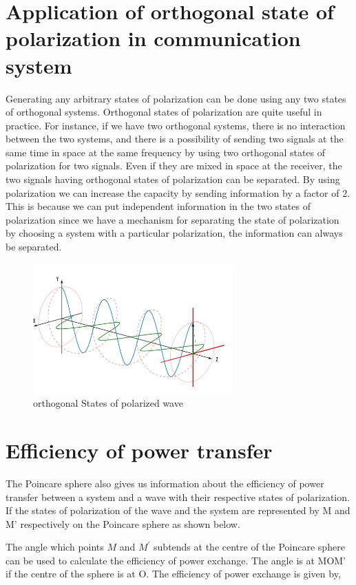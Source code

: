 \section{Application of orthogonal state of polarization in communication system}	
Generating any arbitrary states of polarization can be done using any two states of orthogonal systems. Orthogonal states of polarization are quite useful in practice. For instance, if we have two orthogonal systems, there is no interaction between the two systems, and there is a possibility of sending two signals at the same time in space at the same frequency by using two orthogonal states of polarization for two signals. Even if they are mixed in space at the receiver, the two signals having orthogonal states of polarization can be separated. By using polarization we can increase the capacity by sending information by a factor of 2. This is because we can put independent information in the two states of polarization since we have a mechanism for separating the state of polarization by choosing a system with a particular polarization, the information can always be separated.	
\begin{figure}[h]
\centering
\includegraphics[height=5cm]{"./graphics/orthogonal polarized wave"}
\caption{orthogonal States of polarized wave}
\label{fig:orthogonal-polarized-wave}
\end{figure}


\section{Efficiency of power transfer}
The Poincare sphere also gives us information about the efficiency of power transfer between a system and a wave with their respective states of polarization. If the states of polarization of the wave and the system are represented by M and M' respectively on the Poincare sphere as shown below.

The angle which points $M$ and $M^'$ subtends at the centre of the Poincare sphere can be used to calculate the efficiency of power exchange.
The angle is at MOM' if the centre of the sphere is at O. The efficiency of power exchange is given by,


